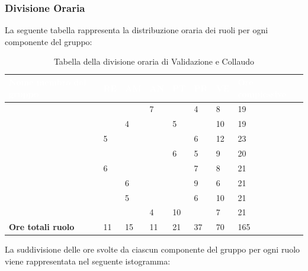 \subsubsection{Divisione Oraria}
La seguente tabella rappresenta la distribuzione oraria dei ruoli per ogni componente del gruppo:
{
	\renewcommand{\arraystretch}{2}

		

	\begin{longtable}{ C{5cm} C{1cm} C{1cm} C{1cm} C{1cm} C{1cm} C{1cm} C{3cm}}
	\caption{Tabella della divisione oraria di Validazione e Collaudo}\\
		\textcolor{white}{\textbf{Nome membro del gruppo}} & 
		\textcolor{white}{\textbf{RE}} & 
		\textcolor{white}{\textbf{AM}} & 
		\textcolor{white}{\textbf{AN}} & 
		\textcolor{white}{\textbf{PT}} & 
		\textcolor{white}{\textbf{PR}} &
		\textcolor{white}{\textbf{VE}} &
		\textcolor{white}{\textbf{Ore complessive}}\\	
		\endhead
        
        \MC{} & & & 7 & & 4 & 8 & 19\\
        \LD{} & & 4 & & 5 & & 10 & 19\\
        \CE{} & 5 & & & & 6 & 12 & 23\\ 
        \SE{} & & & & 6 & 5 & 9 & 20 \\
        \PF{} & 6 & & & & 7 & 8 & 21\\
        \DF{} & & 6 & & & 9 & 6 & 21\\
        \BR{} & & 5 & & & 6 & 10 & 21\\
       \AT{} & & & 4 & 10 & & 7 & 21\\
        \textbf{Ore totali ruolo} & 11 & 15 & 11 & 21 & 37 & 70 & 165\\
		
	\end{longtable}

}


La suddivisione delle ore svolte da ciascun componente del gruppo per ogni ruolo viene rappresentata nel seguente istogramma:

